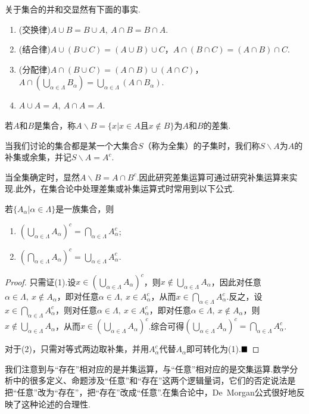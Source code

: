 关于集合的并和交显然有下面的事实.
\begin{theorem}
	\begin{enumerate}[(1)]
		\item (交换律)$A\cup B=B\cup A,\ A\cap B=B\cap A$.
		\item (结合律)$A\cup(B\cup C)=(A\cup B)\cup C$，$A\cap(B\cap C)=(A\cap B)\cap C$.
		\item (分配律)$A\cap (B\cup C)=(A\cap B)\cup(A\cap C)$，$A\cap(\bigcup\limits_{\alpha\in\Lambda}B_\alpha)=\bigcup\limits_{\alpha\in\Lambda}(A\cap B_\alpha)$.
		\item $A\cup A=A,\ A\cap A=A$.
	\end{enumerate}
\end{theorem}
\begin{definition}[差集]
	若$A$和$B$是集合，称$A\backslash B=\{x|x\in A\text{且}x\notin B\}$为$A$和$B$的{\heiti 差集}.
\end{definition}
\begin{definition}[补集]
	当我们讨论的集合都是某一个大集合$S$（称为全集）的子集时，我们称$S\backslash A$为$A$的{\heiti 补集}或{\heiti 余集}，并记$S\backslash A=A^c$.
\end{definition}
当全集确定时，显然$A\backslash B=A\cap B^c$.因此研究差集运算可通过研究补集运算来实现.此外，在集合论中处理差集或补集运算式时常用到以下公式.
\begin{theorem}[De\ Morgan公式]
	若$\{A_\alpha|\alpha\in \Lambda\}$是一族集合，则
	\begin{enumerate}[(1)]
		\item $(\bigcup\limits_{\alpha\in\Lambda}A_\alpha)^c=\bigcap\limits_{\alpha\in\Lambda}A_\alpha^c$;
		\item $(\bigcap\limits_{\alpha\in\Lambda}A_\alpha)^c=\bigcup\limits_{\alpha\in\Lambda}A_\alpha^c$.
	\end{enumerate}
\end{theorem}
\begin{proof}
	只需证(1).设$x\in (\bigcup\limits_{\alpha\in\Lambda}A_{\alpha})^c$，则$x\notin \bigcup\limits_{\alpha\in\Lambda}A_\alpha$，因此对任意$\alpha\in\Lambda,\ x\notin A_\alpha$，即对任意$\alpha\in\Lambda,\ x\in A_{\alpha}^c$，从而$x\in \bigcap\limits_{\alpha\in\Lambda}A_{\alpha}^c$.反之，设$x\in\bigcap\limits_{\alpha\in\Lambda}A_{\alpha}^c$，则对任意$\alpha\in\Lambda,\ x\in A_{\alpha}^c$，即对任意$\alpha\in\Lambda,\ x\notin A_{\alpha}$，则$x\notin\bigcup\limits_{\alpha\in\Lambda}A_{\alpha}$，从而$x\in(\bigcup\limits_{\alpha\in\Lambda}A_\alpha)^c$.综合可得$(\bigcup\limits_{\alpha\in\Lambda}A_\alpha)^c=\bigcap\limits_{\alpha\in\Lambda}A_\alpha^c$.
	
	对于(2)，只需对等式两边取补集，并用$A_{\alpha}^c$代替$A_\alpha$即可转化为(1).$\hfill\blacksquare$
\end{proof}
{\heiti 我们注意到与“存在”相对应的是并集运算，与“任意”相对应的是交集运算.}数学分析中的很多定义、命题涉及“任意”和“存在”这两个逻辑量词，它们的否定说法是把“任意”改为“存在”，把“存在”改成“任意”.在集合论中，De\ Morgan公式很好地反映了这种论述的合理性.
